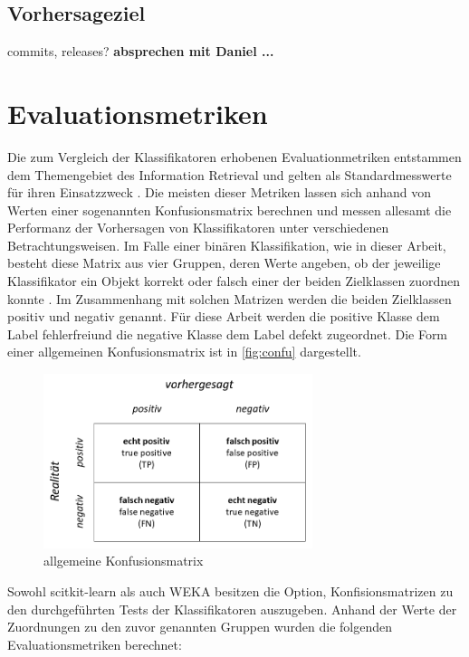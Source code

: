 \subsection*{Vorhersageziel}
commits, releases?
\textbf{absprechen mit Daniel ...}

\section{Evaluationsmetriken}
\label{eval-metrics}

Die zum Vergleich der Klassifikatoren erhobenen Evaluationmetriken entstammen dem Themengebiet des Information Retrieval und gelten als Standardmesswerte für ihren Einsatzzweck \cite{Sammut2017}. Die meisten dieser Metriken lassen sich anhand von Werten einer sogenannten Konfusionsmatrix berechnen und messen allesamt die Performanz der Vorhersagen von Klassifikatoren unter verschiedenen Betrachtungsweisen. Im Falle einer binären Klassifikation, wie in dieser Arbeit, besteht diese Matrix aus vier Gruppen, deren Werte angeben, ob der jeweilige Klassifikator ein Objekt korrekt oder falsch einer der beiden Zielklassen zuordnen konnte \cite{Sammut2017}. Im Zusammenhang mit solchen Matrizen werden die beiden Zielklassen \glqq positiv\grqq{} und \glqq negativ\grqq{} genannt. Für diese Arbeit werden die positive Klasse dem Label \glqq fehlerfrei\grqq und die negative Klasse dem Label \glqq defekt\grqq{} zugeordnet. Die Form einer allgemeinen Konfusionsmatrix ist in \autoref{fig:confu} dargestellt.

\begin{figure}[H]
    \centering
    \includegraphics[width=0.7\textwidth]{images/Confusion}
    \caption{allgemeine Konfusionsmatrix\label{fig:confu}}
\end{figure}

Sowohl scitkit-learn als auch WEKA besitzen die Option, Konfisionsmatrizen zu den durchgeführten Tests der Klassifikatoren auszugeben. Anhand der Werte der Zuordnungen zu den zuvor genannten Gruppen wurden die folgenden Evaluationsmetriken berechnet: 

